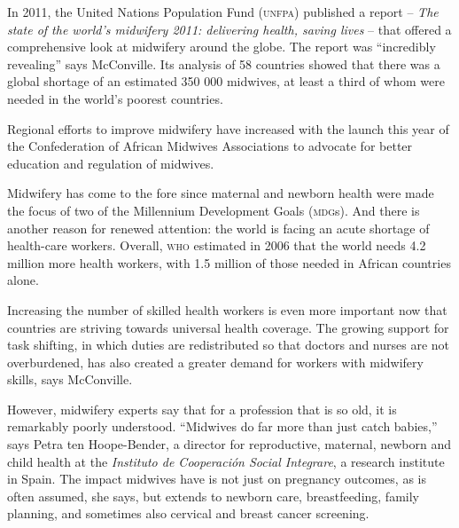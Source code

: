 \documentclass{article}
\begin{document}
In 2011, the United Nations Population Fund (\textsc{unfpa}) published a report –
\textit{The state
of the world's midwifery 2011: delivering health, saving lives}
– that offered a
comprehensive look at midwifery around the globe. The report was “incredibly
revealing” says McConville. Its analysis of 58 countries showed that there was a
global
shortage of an estimated 350 000 midwives, at least a third of whom were needed
in the
world's poorest countries.

Regional efforts to improve midwifery have increased with the launch this year
of the
Confederation of African Midwives Associations to advocate for better education
and regulation of
midwives.

Midwifery has come to the fore since maternal and newborn health were made the
focus of two of
the Millennium Development Goals (\textsc{mdg}s). And there is another reason for renewed
attention: the
world is facing an acute shortage of health-care workers. Overall, \textsc{who} estimated
in 2006 that the
world needs 4.2 million more health workers, with 1.5 million of those needed in
African countries
alone.

Increasing the number of skilled health workers is even more important now that
countries are
striving towards universal health coverage. The growing support for task
shifting, in which duties
are redistributed so that doctors and nurses are not overburdened, has also
created a greater demand
for workers with midwifery skills, says McConville.

However, midwifery experts say that for a profession that is so old, it is
remarkably poorly
understood. “Midwives do far more than just catch babies,” says Petra ten
Hoope-Bender, a director for reproductive, maternal, newborn and child health at
the
\textit{Instituto de Cooperación Social Integrare}, a research institute in Spain.
The impact midwives have is not just on pregnancy outcomes, as is often assumed,
she says, but
extends to newborn care, breastfeeding, family planning, and sometimes also
cervical and breast
cancer screening.
\end{document}
